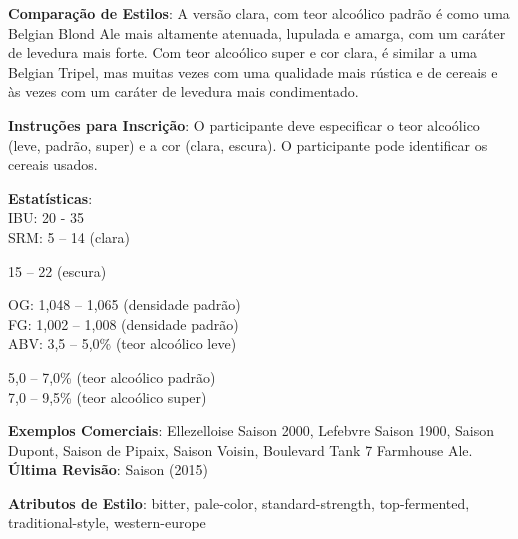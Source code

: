 \textbf{Comparação de Estilos}: A versão clara, com teor alcoólico padrão é como uma Belgian Blond Ale mais altamente atenuada, lupulada e amarga, com um caráter de levedura mais forte. Com teor alcoólico super e cor clara, é similar a uma Belgian Tripel, mas muitas vezes com uma qualidade mais rústica e de cereais e às vezes com um caráter de levedura mais condimentado.

\textbf{Instruções para Inscrição}: O participante deve especificar o teor alcoólico (leve, padrão, super) e a cor (clara, escura). O participante pode identificar os cereais usados.

\textbf{Estatísticas}:\\
IBU: 20 - 35\\
SRM: 5 – 14 (clara)
\begin{adjustwidth}{25pt}{0pt}
15 – 22 (escura)
\end{adjustwidth}
OG: 1,048 – 1,065 (densidade padrão)\\
FG: 1,002 – 1,008 (densidade padrão)\\
ABV: 3,5 – 5,0\% (teor alcoólico leve)
\begin{adjustwidth}{25pt}{0pt}
5,0 – 7,0\% (teor alcoólico padrão)\\
7,0 – 9,5\% (teor alcoólico super)
\end{adjustwidth}

\textbf{Exemplos Comerciais}: Ellezelloise Saison 2000, Lefebvre Saison 1900, Saison Dupont, Saison de Pipaix, Saison Voisin, Boulevard Tank 7 Farmhouse Ale. \\
\textbf{Última Revisão}: Saison (2015)

\textbf{Atributos de Estilo}: bitter, pale-color, standard-strength, top-fermented, traditional-style, western-europe
